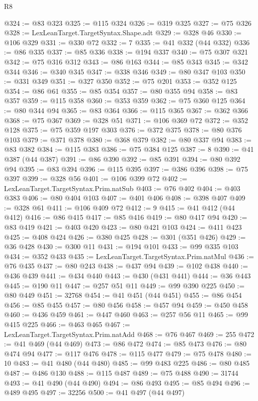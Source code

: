 \begin{lexlean}{R8}
\begin{coremodule}
@324 := @83 @323
@325 := @115 @324
@326 := @319 @325
@327 := @75 @326
@328 := LexLeanTarget.TargetSyntax.Shape.adt
@329 := @328 @46
@330 := @106 @329
@331 := @330 @72
@332 := 7
@335 := @41 @332 (@44 @332)
@336 := @86 @335
@337 := @85 @336
@338 := @194 @337
@340 := @75 @307 @321
@342 := @75 @316 @312
@343 := @86 @163
@344 := @85 @343
@345 := @342 @344
@346 := @340 @345
@347 := @338 @346
@349 := @80 @347 @103
@350 := @331 @349
@351 := @327 @350
@352 := @75 @201
@353 := @352 @125
@354 := @86 @61
@355 := @85 @354
@357 := @80 @355 @94
@358 := @83 @357
@359 := @115 @358
@360 := @353 @359
@362 := @75 @360 @125
@364 := @80 @344 @94
@365 := @83 @364
@366 := @115 @365
@367 := @362 @366
@368 := @75 @367
@369 := @328 @51
@371 := @106 @369 @72
@372 := @352 @128
@375 := @75 @359 @197 @303
@376 := @372 @375
@378 := @80 @376 @103
@379 := @371 @378
@380 := @368 @379
@382 := @80 @337 @94
@383 := @83 @382
@384 := @115 @383
@386 := @75 @384 @125
@387 := 8
@390 := @41 @387 (@44 @387)
@391 := @86 @390
@392 := @85 @391
@394 := @80 @392 @94
@395 := @83 @394
@396 := @115 @395
@397 := @386 @396
@398 := @75 @397
@399 := @328 @56
@401 := @106 @399 @72
@402 := LexLeanTarget.TargetSyntax.Prim.natSub
@403 := @76 @402
@404 := @403 @383
@406 := @80 @404 @103
@407 := @401 @406
@408 := @398 @407
@409 := @328 @61
@411 := @106 @409 @72
@412 := 9
@415 := @41 @412 (@44 @412)
@416 := @86 @415
@417 := @85 @416
@419 := @80 @417 @94
@420 := @83 @419
@421 := @403 @420
@423 := @80 @421 @103
@424 := @411 @423
@425 := @408 @424
@426 := @380 @425
@428 := @301 (@351 @426)
@429 := @36 @428
@430 := @300 @11
@431 := @194 @101
@433 := @99 @335 @103
@434 := @352 @433
@435 := LexLeanTarget.TargetSyntax.Prim.natMul
@436 := @76 @435
@437 := @80 @243
@438 := @437 @94
@439 := @102 @438
@440 := @436 @439
@441 := @434 @440
@443 := @430 (@431 @441)
@444 := @36 @443
@445 := @190 @11
@447 := @257 @51 @11
@449 := @99 @390 @225
@450 := @80 @449
@451 := 32768
@454 := @41 @451 (@44 @451)
@455 := @86 @454
@456 := @85 @455
@457 := @80 @456
@458 := @457 @94
@459 := @450 @458
@460 := @436 @459
@461 := @447 @460
@463 := @257 @56 @11
@465 := @99 @415 @225
@466 := @463 @465
@467 := LexLeanTarget.TargetSyntax.Prim.natAdd
@468 := @76 @467
@469 := 255
@472 := @41 @469 (@44 @469)
@473 := @86 @472
@474 := @85 @473
@476 := @80 @474 @94
@477 := @117 @476
@478 := @115 @477
@479 := @75 @478
@480 := 10
@483 := @41 @480 (@44 @480)
@485 := @99 @483 @225
@486 := @80 @485
@487 := @486 @130
@488 := @115 @487
@489 := @75 @488
@490 := 31744
@493 := @41 @490 (@44 @490)
@494 := @86 @493
@495 := @85 @494
@496 := @489 @495
@497 := 32256
@500 := @41 @497 (@44 @497)

\end{coremodule}
\end{lexlean}
